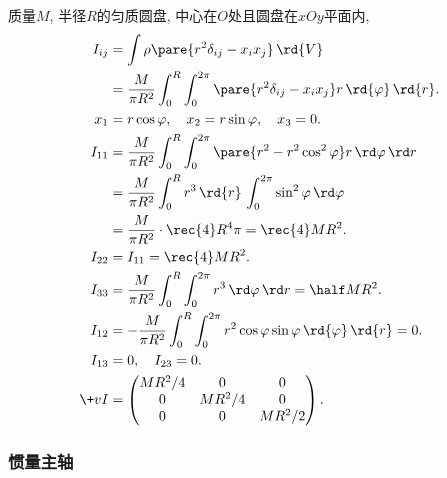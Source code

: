 \documentclass[../LectureNotes.tex]{subfiles}
\begin{document}
\begin{sample}
    \begin{ex}
        质量$M$, 半径$R$的匀质圆盘, 中心在$O$处且圆盘在$xOy$平面内,
        \begin{align*}
            I_{ij} &= \int \rho \pare{r^2\delta_{ij} - x_ix_j}\,\rd{V} \\
            &= \frac{M}{\pi R^2} \int_0^R \int_0^{2\pi} \pare{r^2 \delta_{ij} - x_ix_j}r\,\rd{\varphi}\,\rd{r}. \\
            x_1 &= r\cos\varphi,\quad x_2 = r\sin\varphi,\quad x_3 = 0. \\
            I_{11} &= \frac{M}{\pi R^2} \int_0^R \int_0^{2\pi} \pare{r^2 - r^2\cos^2\varphi} r\,\rd\varphi \,\rd r \\
            &= \frac{M}{\pi R^2} \int_0^R r^3\,\rd{r}\,\int_0^{2\pi} \sin^2 \varphi\,\rd\varphi \\
            &= \frac{M}{\pi R^2} \cdot \rec{4} R^4 \pi = \rec{4}MR^2. \\
            I_{22} &= I_{11} = \rec{4}MR^2. \\
            I_{33} &= \frac{M}{\pi R^2} \int_0^R \int_{0}^{2\pi} r^3\,\rd\varphi \,\rd r = \half MR^2. \\
            I_{12} &= -\frac{M}{\pi R^2} \int_0^R \int_0^{2\pi} r^2\cos\varphi\sin\varphi\,\rd{\varphi}\,\rd{r} = 0. \\
            I_{13} &= 0,\quad I_{23} = 0. \\
            \+vI &= \begin{pmatrix}
                MR^2/4 & 0 & 0 \\
                0 & MR^2/4 & 0 \\
                0 & 0 & MR^2/2
            \end{pmatrix}.
        \end{align*}
    \end{ex}
\end{sample}


\subsubsection{惯量主轴} %
\label{ssub:惯量主轴}
\end{document}
